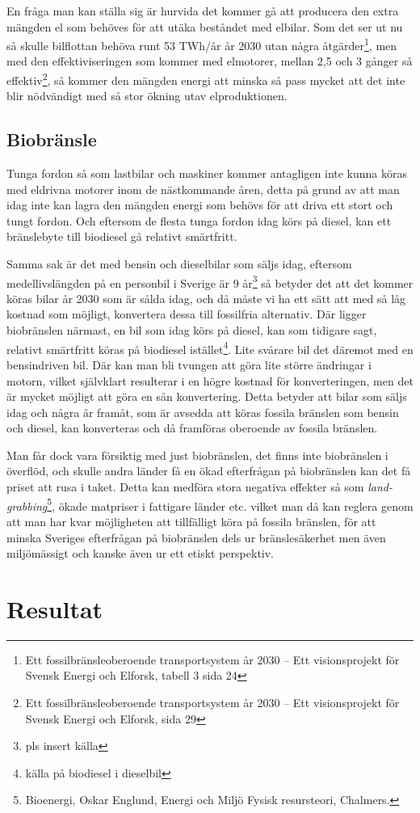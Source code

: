 \documentclass[a4paper,11pt,fleqn, titlepage]{article}
\begin{document}
En fråga man kan ställa sig är hurvida det kommer gå att producera den extra mängden el som behöves för att utäka beståndet med elbilar. Som det ser ut nu så skulle bilflottan behöva runt 53 TWh/år år 2030 utan några åtgärder\footnote{Ett fossilbränsleoberoende transportsystem år 2030 – Ett visionsprojekt för Svensk Energi och Elforsk, tabell 3 sida 24}, men med den effektiviseringen som kommer med elmotorer, mellan 2,5 och 3 gånger så effektiv\footnote{Ett fossilbränsleoberoende transportsystem år 2030 – Ett visionsprojekt för Svensk Energi och Elforsk, sida 29},  så kommer den mängden energi att minska så pass mycket att det inte blir nödvändigt med så stor ökning utav elproduktionen.

\subsection{Biobränsle}
Tunga fordon så som lastbilar och maskiner kommer antagligen inte kunna
köras med eldrivna motorer inom de nästkommande åren, detta på grund av att
man idag inte kan lagra den mängden energi som behövs för att driva ett
stort och tungt fordon. Och eftersom de flesta tunga fordon idag körs på
diesel, kan ett bränslebyte till biodiesel gå relativt smärtfritt.

Samma sak är det med bensin och dieselbilar som säljs idag, eftersom
medellivslängden på en personbil i Sverige är 9 år\footnote{pls insert
källa} så betyder det att det kommer köras bilar år 2030 som är sålda idag,
och då måste vi ha ett sätt att med så låg kostnad som möjligt, konvertera
dessa till fossilfria alternativ. Där ligger biobränslen närmast, en bil
som idag körs på diesel, kan som tidigare sagt, relativt smärtfritt köras
på biodiesel istället\footnote{källa på biodiesel i dieselbil}. Lite
svårare bil det däremot med en bensindriven bil. Där kan man bli tvungen
att göra lite större ändringar i motorn, vilket självklart resulterar i en
högre kostnad för konverteringen, men det är mycket möjligt att göra en sån
konvertering. Detta betyder att bilar som säljs idag och några år framåt,
som är avsedda att köras fossila bränslen som bensin och diesel, kan
konverteras och då framföras oberoende av fossila bränslen.

Man får dock vara försiktig med just biobränslen, det finns inte
biobränslen i överflöd, och skulle andra länder få en ökad efterfrågan på
biobränslen kan det få priset att rusa i taket. Detta kan medföra stora
negativa effekter så som \emph{land-grabbing}\footnote{Bioenergi, Oskar
Englund, Energi och Miljö Fysisk resursteori, Chalmers.}, ökade matpriser i
fattigare länder etc. vilket man då kan reglera genom att man har kvar
möjligheten att tillfälligt köra på fossila bränslen, för att minska
Sveriges efterfrågan på biobränslen dels ur bränslesäkerhet men även
miljömässigt och kanske även ur ett etiskt perspektiv.

\section{Resultat}
\end{document}
